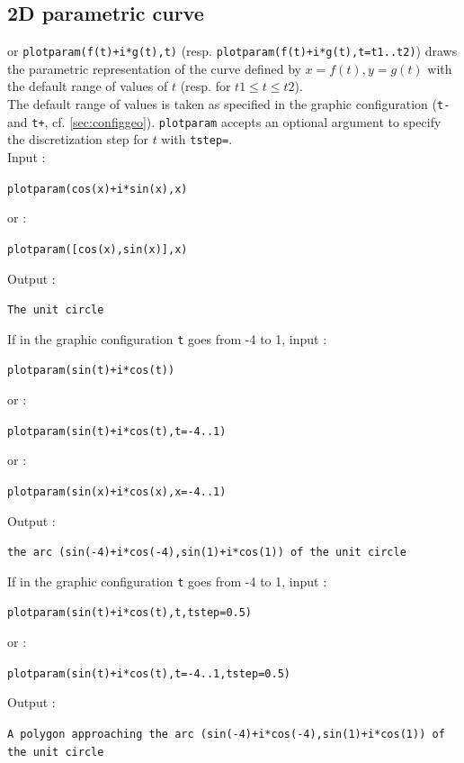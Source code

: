 \documentclass[a4paper,11pt]{book}
\begin{document}
\subsection{2D parametric curve }
or {\tt plotparam(f(t)+i*g(t),t)} (resp. 
{\tt plotparam(f(t)+i*g(t),t=t1..t2)})
draws the parametric representation of the curve 
defined by  $x=f(t),y=g(t)$ 
with the default range of values of $t$ (resp. for $t1 \leq t\leq t2$).\\
The default range of values is taken as specified 
in the graphic configuration ({\tt t-} and {\tt t+}, 
cf. \ref{sec:configgeo}).
{\tt plotparam} accepts an optional argument to specify the discretization
step for $t$ with {\tt tstep=}.\\ 
Input :
\begin{center}{\tt plotparam(cos(x)+i*sin(x),x) }\end{center}
or :
\begin{center}{\tt plotparam([cos(x),sin(x)],x) }\end{center}
Output :
\begin{center}{\tt The unit circle}\end{center}
If in the graphic configuration {\tt t} goes from -4 to 1, input :
\begin{center}{\tt plotparam(sin(t)+i*cos(t))}\end{center}
or :
\begin{center}{\tt plotparam(sin(t)+i*cos(t),t=-4..1) }\end{center}
or :
\begin{center}{\tt plotparam(sin(x)+i*cos(x),x=-4..1) }\end{center}
Output :
\begin{center}{\tt the arc (sin(-4)+i*cos(-4),sin(1)+i*cos(1)) of the unit circle}\end{center}
If in the graphic configuration {\tt t} goes from -4 to 1, input :
\begin{center}{\tt plotparam(sin(t)+i*cos(t),t,tstep=0.5)}\end{center}
or :
\begin{center}{\tt plotparam(sin(t)+i*cos(t),t=-4..1,tstep=0.5)}\end{center}
Output :
\begin{center}{\tt A polygon approaching the arc (sin(-4)+i*cos(-4),sin(1)+i*cos(1)) of the unit circle}\end{center}
\end{document}
